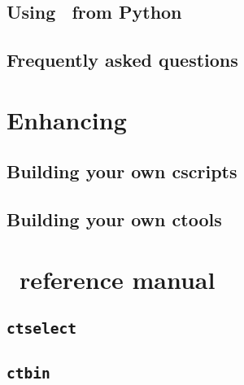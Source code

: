 \documentclass{article}[12pt,a4]
\begin{document}
\subsection{Using \this\ from Python}

\subsection{Frequently asked questions}


\section{Enhancing \this}

\subsection{Building your own cscripts}

\subsection{Building your own ctools}


%
\section{\this\ reference manual}

\subsection{{\tt ctselect}}

\subsection{{\tt ctbin}}
\end{document}
